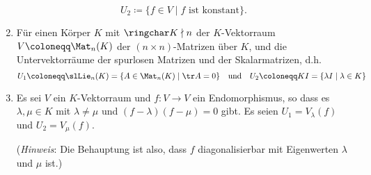 \begin{question}
\begin{enumerate}[leftmargin=*]
\[        U_2 \coloneqq \{f \in V \mid \text{$f$ ist konstant}\}.
      \]
%       
    \item
      Für einen Körper $K$ mit $\ringchar K \nmid n$ der $K$-Vektorraum $V \coloneqq \Mat_n(K)$ der $(n \times n)$-Matrizen über $K$, und die Untervektorräume der spurlosen Matrizen und der Skalarmatrizen, d.h.\
      \[
        U_1 \coloneqq \slLie_n(K) = \{ A \in \Mat_n(K) \mid \tr A  = 0 \}
        \quad\text{und}\quad
        U_2 \coloneqq K I = \{ \lambda I \mid \lambda \in K \}
      \]
    \item
      Es sei $V$ ein $K$-Vektorraum und $f \colon V \to V$ ein Endomorphismus, so dass es $\lambda, \mu \in K$ mit $\lambda \neq \mu$ und $(f-\lambda)(f-\mu) = 0$ gibt.
      Es seien $U_1 = V_\lambda(f)$ und $U_2 = V_\mu(f)$.
      
      (\emph{Hinweis}:
       Die Behauptung ist also, dass $f$ diagonalisierbar mit Eigenwerten $\lambda$ und $\mu$ ist.)
  \end{enumerate}
\end{question}


